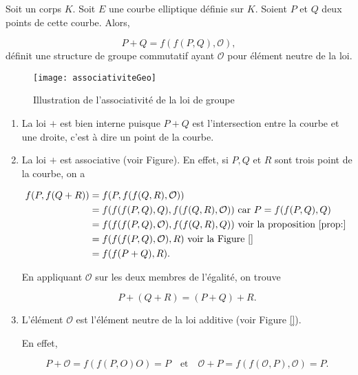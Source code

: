\begin{theoreme}
    Soit un corps $K$. Soit $E$ une courbe elliptique définie sur $K$. Soient $P$ et $Q$ deux
    points de cette courbe. Alors, 

    \[
    P + Q = f(f(P,Q),\mathcal{O})
    ,\] 
    définit une structure de groupe commutatif ayant $\mathcal{O}$ pour élément neutre
    de la loi.
\end{theoreme}

\begin{figure}[h]
    \centering
    \texttt{[image: associativiteGeo]}
    \caption{Illustration de l'associativité de la loi de groupe}
    \label{fig:associativiteGeo}
\end{figure}

\begin{demonstration}
    \begin{enumerate}
        \item La loi $+$ est bien interne puisque $P + Q$ est l'intersection entre la courbe et
            une droite, c'est à dire un point de la courbe.

        \item La loi $+$ est associative (voir Figure). En effet, si $P,Q$ et $R$ sont trois
            point de la courbe, on a

            \begin{align*}
            f(P,f(Q+R)) &= f(P,f(f(Q,R),\mathcal{O})) \\
            &= f(f(f(P,Q),Q),f(f(Q,R),\mathcal{O})) \text{ car } P = f(f(P,Q),Q) \\
            &= f(f(f(P,Q),\mathcal{O}),f(f(Q,R),Q)) \text{ voir la proposition \ref{prop:} } \\
            &= f(f(f(P,Q),\mathcal{O}),R) \text{ voir la Figure \ref{} } \\
            &= f(f(P+Q),R)
            .\end{align*}

            En appliquant $\mathcal{O}$ sur les deux membres de l'égalité, on trouve

            \[
            P + (Q+R) = (P+Q) + R
            .\] 

        \item L'élément $\mathcal{O}$ est l'élément neutre de la loi additive (voir Figure
            \ref{}). 

            En effet,

            \[
            P + \mathcal{O} = f(f(P,O)O) = P \quad \text{et} \quad \mathcal{O}+P =
            f(f(\mathcal{O},P),\mathcal{O}) = P
            .\] 


\end{enumerate}
\end{demonstration}
